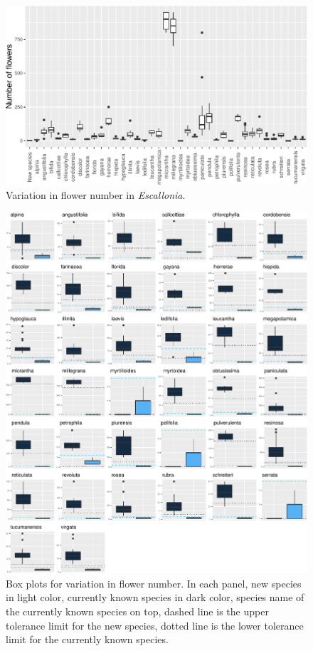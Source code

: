 \documentclass[fleqn,10pt,lineno]{wlpeerj} %
\begin{document}
\begin{figure}[ht]
\centering
\includegraphics[width=\linewidth]{fig3}
\caption{Variation in flower number in \emph{Escallonia}.}
\label{fig:fig3}
\end{figure}

\begin{figure}[ht]
\centering
\includegraphics[width=\linewidth]{fig4}
\caption{Box plots for variation in flower number. In each panel, new species in light color, currently known species in dark color, species name of the currently known species on top, dashed line is the upper tolerance limit for the new species, dotted line is the lower tolerance limit for the currently known species.}
\label{fig:fig4}
\end{figure}
\end{document}
